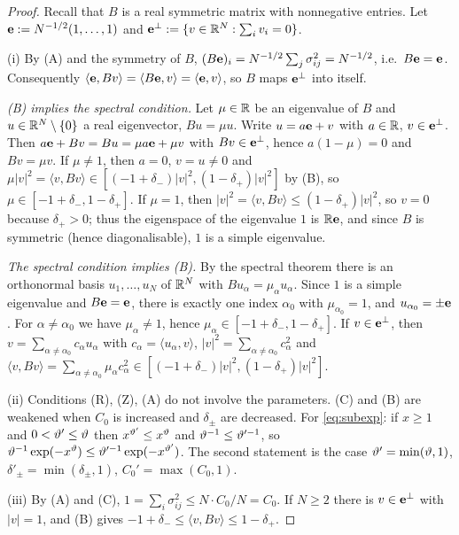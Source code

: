 \begin{proof}
Recall that $B$ is a real symmetric matrix with nonnegative entries. Let $\mathbf{e}:=N^{-1/2}(1,\dots,1)$ and $\mathbf{e}^\perp:=\{v\in\mathbb{R}^N:\sum_iv_i=0\}$.

(i) By (A) and the symmetry of $B$, $(B\mathbf{e})_i=N^{-1/2}\sum_j\sigma_{ij}^2=N^{-1/2}$, i.e.\ $B\mathbf{e}=\mathbf{e}$. Consequently $\langle\mathbf{e},Bv\rangle=\langle B\mathbf{e},v\rangle=\langle\mathbf{e},v\rangle$, so $B$ maps $\mathbf{e}^\perp$ into itself.

\emph{\textup{(B)} implies the spectral condition.} Let $\mu\in\mathbb{R}$ be an eigenvalue of $B$ and $u\in\mathbb{R}^N\setminus\{0\}$ a real eigenvector, $Bu=\mu u$. Write $u=a\mathbf{e}+v$ with $a\in\mathbb{R}$, $v\in\mathbf{e}^\perp$. Then $a\mathbf{e}+Bv=Bu=\mu a\mathbf{e}+\mu v$ with $Bv\in\mathbf{e}^\perp$, hence
$a(1-\mu)=0$ and $Bv=\mu v$. If $\mu\ne1$, then $a=0$, $v=u\ne0$ and $\mu|v|^2=\langle v,Bv\rangle\in[(-1+\delta_-)|v|^2,(1-\delta_+)|v|^2]$ by (B), so $\mu\in[-1+\delta_-,1-\delta_+]$.
If $\mu=1$, then $|v|^2=\langle v,Bv\rangle\le(1-\delta_+)|v|^2$, so $v=0$ because $\delta_+>0$; thus the eigenspace of the eigenvalue $1$ is $\mathbb{R}\mathbf{e}$, and since $B$ is symmetric (hence diagonalisable), $1$ is a simple eigenvalue.

\emph{The spectral condition implies \textup{(B)}.} By the spectral theorem there is an orthonormal basis $u_1,\dots,u_N$ of $\mathbb{R}^N$ with $Bu_\alpha=\mu_\alpha u_\alpha$. Since $1$ is a simple eigenvalue and $B\mathbf{e}=\mathbf{e}$,
there is exactly one index $\alpha_0$ with $\mu_{\alpha_0}=1$, and $u_{\alpha_0}=\pm\mathbf{e}$. For $\alpha\ne\alpha_0$ we have $\mu_\alpha\ne1$, hence $\mu_\alpha\in[-1+\delta_-,1-\delta_+]$.
If $v\in\mathbf{e}^\perp$, then $v=\sum_{\alpha\ne\alpha_0}c_\alpha u_\alpha$ with $c_\alpha=\langle u_\alpha,v\rangle$, $|v|^2=\sum_{\alpha\ne\alpha_0}c_\alpha^2$ and
$\langle v,Bv\rangle=\sum_{\alpha\ne\alpha_0}\mu_\alpha c_\alpha^2\in[(-1+\delta_-)|v|^2,(1-\delta_+)|v|^2]$.

(ii) Conditions (R), (Z), (A) do not involve the parameters. (C) and (B) are weakened when $C_0$ is increased and $\delta_\pm$ are decreased. For \eqref{eq:subexp}: if $x\ge1$ and $0<\vartheta'\le\vartheta$ then $x^{\vartheta'}\le x^{\vartheta}$ and $\vartheta^{-1}\le\vartheta'^{-1}$, so
$\vartheta^{-1}\exp(-x^\vartheta)\le\vartheta'^{-1}\exp(-x^{\vartheta'})$. The second statement is the case $\vartheta'=\min(\vartheta,1)$, $\delta'_\pm=\min(\delta_\pm,1)$, $C_0'=\max(C_0,1)$.

(iii) By (A) and (C), $1=\sum_{i}\sigma_{ij}^2\le N\cdot C_0/N=C_0$. If $N\ge2$ there is $v\in\mathbf{e}^\perp$ with $|v|=1$, and (B) gives $-1+\delta_-\le\langle v,Bv\rangle\le1-\delta_+$.


\end{proof}
